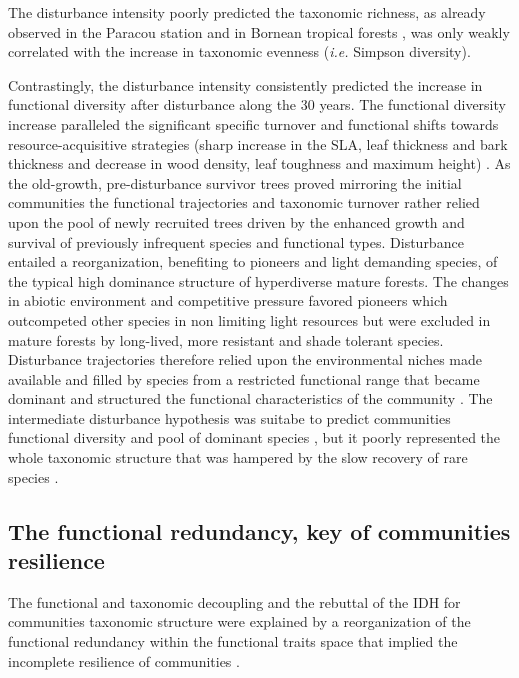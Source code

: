 \documentclass[fleqn,10pt]{ArtEcoFoG} %
\theoremstyle{definition}
\theoremstyle{definition}
\theoremstyle{definition}
\theoremstyle{remark}
\begin{document}
The disturbance intensity poorly predicted the taxonomic richness, as
already observed in the Paracou station \citep{Baraloto2012a} and in
Bornean tropical forests \citep{Cannon1998}, was only weakly correlated
with the increase in taxonomic evenness (\emph{i.e.} Simpson diversity).

Contrastingly, the disturbance intensity consistently predicted the
increase in functional diversity after disturbance along the 30 years.
The functional diversity increase paralleled the significant specific
turnover and functional shifts towards resource-acquisitive strategies
(sharp increase in the SLA, leaf thickness and bark thickness and
decrease in wood density, leaf toughness and maximum height)
\citep{Westoby1998, Wright2004, Reich2014}. As the old-growth,
pre-disturbance survivor trees proved mirroring the initial communities
\citep{Herault2018} the functional trajectories and taxonomic turnover
rather relied upon the pool of newly recruited trees driven by the
enhanced growth and survival of previously infrequent species and
functional types. Disturbance entailed a reorganization, benefiting to
pioneers and light demanding species, of the typical high dominance
structure of hyperdiverse mature forests. The changes in abiotic
environment and competitive pressure favored pioneers which outcompeted
other species in non limiting light resources but were excluded in
mature forests by long-lived, more resistant and shade tolerant species.
Disturbance trajectories therefore relied upon the environmental niches
made available and filled by species from a restricted functional range
that became dominant and structured the functional characteristics of
the community \citep{Grime1998}. The intermediate disturbance hypothesis
was suitabe to predict communities functional diversity and pool of
dominant species \citep{Molino2001}, but it poorly represented the whole
taxonomic structure that was hampered by the slow recovery of rare
species \citep{Hubbell2001, Chave2004}.

\subsection{The functional redundancy, key of communities
resilience}\label{the-functional-redundancy-key-of-communities-resilience}

The functional and taxonomic decoupling and the rebuttal of the IDH for
communities taxonomic structure were explained by a reorganization of
the functional redundancy within the functional traits space that
implied the incomplete resilience of communities
\citep{Trenbath1999, Elmqvist2003, Diaz2005}.
\end{document}
